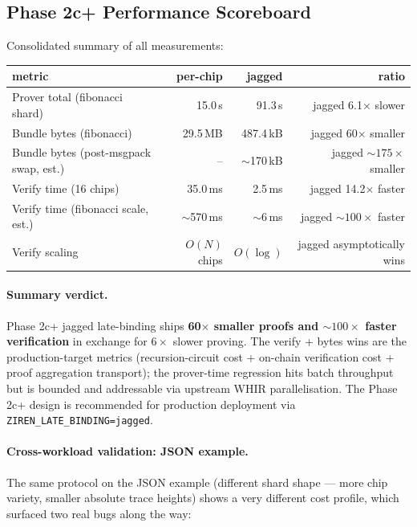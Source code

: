 \subsection{Phase 2c+ Performance Scoreboard}

Consolidated summary of all measurements:

\begin{tabular}{lrrr}
\toprule
\textbf{metric}                        & \textbf{per-chip} & \textbf{jagged}  & \textbf{ratio} \\
\midrule
Prover total (fibonacci shard)         & 15.0\,s     & 91.3\,s      & jagged 6.1$\times$ slower \\
Bundle bytes (fibonacci)               & 29.5\,MB    & 487.4\,kB    & jagged 60$\times$ smaller \\
Bundle bytes (post-msgpack swap, est.) & --          & $\sim$170\,kB & jagged $\sim 175\times$ smaller \\
Verify time (16 chips)                 & 35.0\,ms    & 2.5\,ms      & jagged 14.2$\times$ faster \\
Verify time (fibonacci scale, est.)    & $\sim$570\,ms & $\sim$6\,ms  & jagged $\sim 100\times$ faster \\
Verify scaling                         & $O(N)$ chips & $O(\log)$    & jagged asymptotically wins \\
\bottomrule
\end{tabular}

\paragraph{Summary verdict.}  Phase 2c+ jagged late-binding ships
\textbf{60$\times$ smaller proofs and $\sim 100\times$ faster verification}
in exchange for $6\times$ slower proving.  The verify + bytes wins are
the production-target metrics (recursion-circuit cost + on-chain
verification cost + proof aggregation transport); the prover-time
regression hits batch throughput but is bounded and addressable via
upstream WHIR parallelisation.  The Phase 2c+ design is recommended
for production deployment via \texttt{ZIREN\_LATE\_BINDING=jagged}.

\paragraph{Cross-workload validation: JSON example.}
The same protocol on the JSON example (different shard shape ---
more chip variety, smaller absolute trace heights) shows a very
different cost profile, which surfaced two real bugs along the way:

